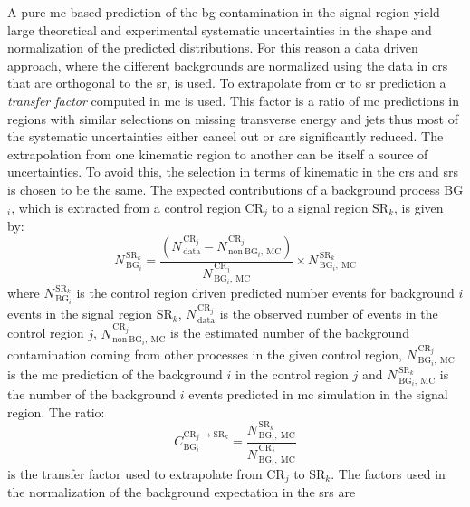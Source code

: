 A pure \gls{mc} based prediction of the \gls{bg} contamination in the signal
region yield large theoretical and experimental systematic uncertainties in the
shape and normalization of the predicted distributions. For this reason a data
driven approach, where the different backgrounds are normalized using the data
in \glspl{cr} that are orthogonal to the \gls{sr}, is used. To extrapolate from
\gls{cr} to \gls{sr} prediction a \emph{transfer factor} computed in \gls{mc} is
used. This factor is a ratio of \gls{mc} predictions in regions with similar
selections on missing transverse energy and jets thus most of the systematic
uncertainties either cancel out or are significantly reduced. The extrapolation
from one kinematic region to another can be itself a source of uncertainties.
To avoid this, the selection in terms of kinematic in the \glspl{cr} and
\glspl{sr} is chosen to be the same. The expected contributions of a background
process BG$_i$, which is extracted from a control region CR$_j$ to a signal
region SR$_k$, is given by:
\begin{equation}
  \label{eq:100}
  N_{\mathrm{\, BG}_i}^{\mathrm{\, SR}_k} = \frac{(N_\mathrm{\,
      data}^{\mathrm{\, CR}_j} - N_{\mathrm{\,
        non~BG}_i,~\mathrm{MC}}^{\mathrm{\, CR}_j})}
  {N^{\mathrm{\, CR}_j}_{\mathrm{\, BG}_i \mathrm{,~MC}}} \times
  N^{\mathrm{\, SR}_k}_{\mathrm{\, BG}_i,~\mathrm{MC}}
\end{equation}
where $N_{\mathrm{\, BG}_i}^{\mathrm{\, SR}_k}$ is the control region driven
predicted number events for background $i$ events in the signal region SR$_k$,
$N_\mathrm{\, data}^{\mathrm{\, CR}_j}$ is the observed number of events in the
control region $j$, $N_{\mathrm{\, non~BG}_i,~\mathrm{MC}}^{\mathrm{\, CR}_j}$
is the estimated number of the background contamination coming from other
processes in the given control region,
$N^{\mathrm{\, CR}_j}_{\mathrm{\, BG}_i \mathrm{,~MC}}$ is the \gls{mc}
prediction of the background $i$ in the control region $j$ and
$N^{\mathrm{\, SR}_k}_{\mathrm{\, BG}_i,~\mathrm{MC}}$ is the number of the
background $i$ events predicted in \gls{mc} simulation in the signal region. The
ratio:
\begin{equation}
  \label{eq:101}
  C_{\mathrm{BG}_i}^{\mathrm{CR}_j \rightarrow \mathrm{SR}_k} = \frac{
    N^{\mathrm{\, SR}_k}_{\mathrm{\, BG}_i,~\mathrm{MC}}}{N^{\mathrm{\,
        CR}_j}_{\mathrm{\, BG}_i \mathrm{,~MC}}}
\end{equation}
is the transfer factor used to extrapolate from CR$_j$ to SR$_k$. The factors
used in the normalization of the background expectation in the \glspl{sr} are
